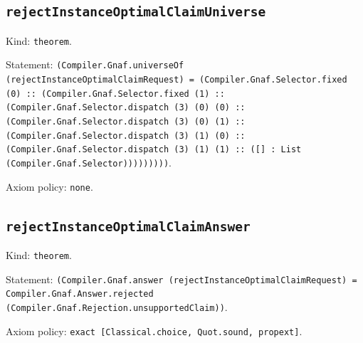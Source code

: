 \documentclass[11pt]{article}
\begin{document}
\subsection*{\texttt{rejectInstanceOptimalClaimUniverse}}
\noindent Kind: \texttt{theorem}.\par
\noindent Statement: \texttt{(Compiler.Gnaf.universeOf (rejectInstanceOptimalClaimRequest) = (Compiler.Gnaf.Selector.fixed (0) :: (Compiler.Gnaf.Selector.fixed (1) :: (Compiler.Gnaf.Selector.dispatch (3) (0) (0) :: (Compiler.Gnaf.Selector.dispatch (3) (0) (1) :: (Compiler.Gnaf.Selector.dispatch (3) (1) (0) :: (Compiler.Gnaf.Selector.dispatch (3) (1) (1) :: ([] : List (Compiler.Gnaf.Selector)))))))))}.\par
\noindent Axiom policy: \texttt{none}.\par
\subsection*{\texttt{rejectInstanceOptimalClaimAnswer}}
\noindent Kind: \texttt{theorem}.\par
\noindent Statement: \texttt{(Compiler.Gnaf.answer (rejectInstanceOptimalClaimRequest) = Compiler.Gnaf.Answer.rejected (Compiler.Gnaf.Rejection.unsupportedClaim))}.\par
\noindent Axiom policy: \texttt{exact [Classical.choice, Quot.sound, propext]}.\par
\end{document}
